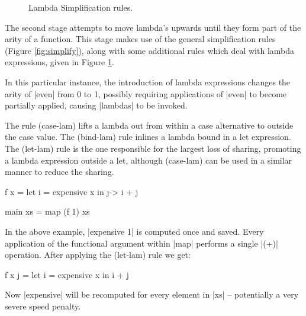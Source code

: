\documentclass[preprint]{sigplanconf}
\begin{document}
\begin{figure}
\begin{simplify}





\end{simplify}
\caption{Lambda Simplification rules.}
\label{fig:lambda_simplify}
\end{figure}

The second stage attempts to move lambda's upwards until they form part of the arity of a function. This stage makes use of the general simplification rules (Figure \ref{fig:simplify}), along with some additional rules which deal with lambda expressions, given in Figure \ref{fig:lambda_simplify}.

In this particular instance, the introduction of lambda expressions changes the arity of |even| from 0 to 1, possibly requiring applications of |even| to become partially applied, causing |lambdas| to be invoked.

The rule (case-lam) lifts a lambda out from within a case alternative to outside the case value. The (bind-lam) rule inlines a lambda bound in a let expression. The (let-lam) rule is the one responsible for the largest loss of sharing, promoting a lambda expression outside a let, although (case-lam) can be used in a similar manner to reduce the sharing.

\begin{example}
\begin{code}
f x = let i = expensive x
      in \j -> i + j

main xs = map (f 1) xs
\end{code}

In the above example, |expensive 1| is computed once and saved. Every application of the functional argument within |map| performs a single |(+)| operation. After applying the (let-lam) rule we get:

\begin{code}
f x j = let i = expensive x
        in i + j
\end{code}

Now |expensive| will be recomputed for every element in |xs| -- potentially a very severe speed penalty.
\end{example}
\end{document}
